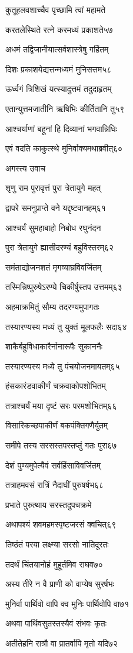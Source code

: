 कुतूहलवशाच्चैव पृच्छामि त्वां महामते

करतलेस्थिते रत्ने करमध्यं प्रकाशते५७

अधमं तद्विजानीयात्सर्वशास्त्रेषु गर्हितम्

दिशः प्रकाशयेद्यत्तन्मध्यमं मुनिसत्तम५८

ऊर्ध्वगं त्रिशिखं यत्स्यादुत्तमं तदुदाहृतम्

एतान्युत्तमजातीनि ऋषिभिः कीर्तितानि तु५९

आश्चर्याणां बहूनां हि दिव्यानां भगवान्निधिः

एवं वदति काकुत्स्थे मुनिर्वाक्यमथाब्रवीत्६०

अगस्त्य उवाच

शृणु राम पुरावृत्तं पुरा त्रेतायुगे महत्

द्वापरे समनुप्राप्ते वने यद्दृष्टवानहम्६१

आश्चर्यं सुमहाबाहो निबोध रघुनंदन

पुरा त्रेतायुगे ह्यासीदरण्यं बहुविस्तरम्६२

समंताद्योजनशतं मृगव्याघ्रविवर्जितम्

तस्मिन्निष्पुरुषेऽरण्ये चिकीर्षुस्तप उत्तमम्६३

अहमाक्रमितुं सौम्य तदरण्यमुपागतः

तस्यारण्यस्य मध्यं तु युक्तं मूलफलैः सदा६४

शाकैर्बहुविधाकारैर्नानारूपैः सुकाननैः

तस्यारण्यस्य मध्ये तु पंचयोजनमायतम्६५

हंसकारंडवाकीर्णं चक्रवाकोपशोभितम्

तत्राश्चर्यं मया दृष्टं सरः परमशोभितम्६६

विसारिकच्छपाकीर्णं बकपंक्तिगणैर्युतम्

समीपे तस्य सरसस्तपस्तप्तुं गतः पुरा६७

देशं पुण्यमुपेत्यैवं सर्वहिंसाविवर्जितम्

तत्राहमवसं रात्रिं नैदाघीं पुरुषर्षभ६८

प्रभाते पुरुत्थाय सरस्तदुपचक्रमे

अथापश्यं शवमहमस्पृष्टजरसं क्वचित्६९

तिष्ठंतं परया लक्ष्म्या सरसो नातिदूरतः

तदर्थं चिंतयानोहं मुहूर्तमिव राघव७०

अस्य तीरे न वै प्राणी को वाप्येष सुरर्षभः

मुनिर्वा पार्थिवो वापि क्व मुनिः पार्थिवोपि वा७१

अथवा पार्थिवसुतस्तस्यैवं संभवः कृतः

अतीतेहनि रात्रौ वा प्रातर्वापि मृतो यदि७२

